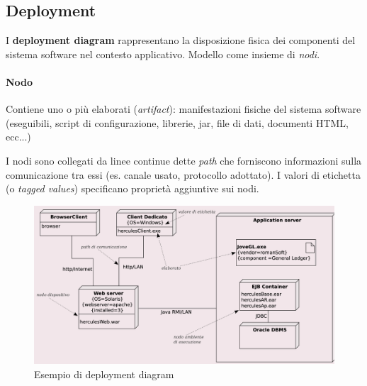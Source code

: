 \subsection{Deployment}

I \textbf{deployment diagram} rappresentano la disposizione fisica dei componenti del sistema software nel contesto applicativo. Modello come insieme di \textit{nodi}.

\paragraph{Nodo} Contiene uno o più elaborati (\textit{artifact}): manifestazioni fisiche del sistema software (eseguibili, script di configurazione, librerie, jar, file di dati, documenti HTML, ecc...)

I nodi sono collegati da linee continue dette \textit{path} che forniscono informazioni sulla comunicazione tra essi (es. canale usato, protocollo adottato). I valori di etichetta (o \textit{tagged values}) specificano proprietà aggiuntive sui nodi.

\begin{figure}[h!]
    \centering
    \includegraphics[width=0.75\linewidth]{assets/UML/deployment/deployment.png}
    \caption{Esempio di deployment diagram}
\end{figure}

\newpage